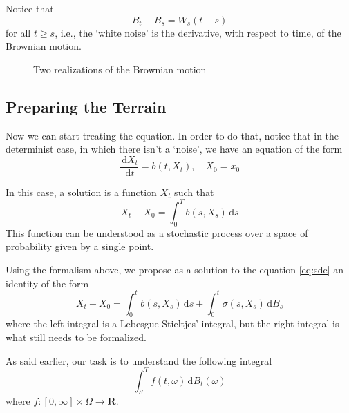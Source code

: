 \documentclass[12pt,a4paper]{article}
\theoremstyle{definition}
\begin{document}
Notice that
\[
B_t-B_s=W_s(t-s)
\]
for all $t\geq s$, i.e., the `white noise' is the derivative, with respect to time, of the Brownian motion.

\begin{figure}[h!]
\centering
{}
\caption{Two realizations of the Brownian motion \cite{texexchange:brownian-tikz}}
\label{fig:brownian_motion}
\end{figure}

\subsection{Preparing the Terrain}

Now we can start treating the equation. In order to do that, notice that in the determinist case, in which there isn't a `noise', we have an equation of the form
\begin{equation}
	\frac{\, \mathrm{d} X_t}{\, \mathrm{d} t} = b(t, X_t), \quad X_0 = x_0
\end{equation}

In this case, a solution is a function $X_t$ such that
\begin{equation}
	X_t - X_0 = \int_0^T b(s, X_s) \, \mathrm{d}s
\end{equation}
This function can be understood as a stochastic process over a space of probability given by a single point.

Using the formalism above, we propose as a solution to the equation \eqref{eq:sde} an identity of the form
\begin{equation}\label{eq:sde-sol-prop}
	X_t - X_0 = \int_0^t b(s, X_s) \, \mathrm{d}s + \int_0^t \sigma(s, X_s) \, \mathrm{d}B_s
\end{equation}
where the left integral is a Lebesgue-Stieltjes' integral, but the right integral is what still needs to be formalized. 

As said earlier, our task is to understand the following integral
\begin{equation}\label{eq:gen_ito_integrand}
	\int_S^T f(t, \omega) \, \mathrm{d}B_t(\omega)
\end{equation}
where $f : [0, \infty] \times \Omega \longrightarrow \textbf{R}$.
\end{document}
